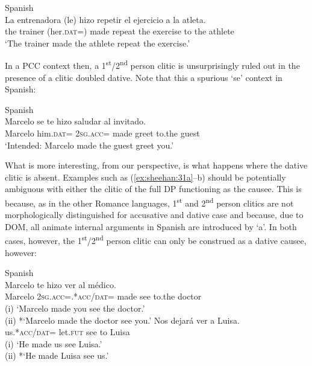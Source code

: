 \documentclass[output=paper,colorlinks,citecolor=brown,nonflat]{./langscibook}
\begin{document}
\ea%
    \label{ex:sheehan:29}
    Spanish \citep[448]{Torrego2010}\\
    \gll    La   entrenadora  (le)   hizo   repetir  el   ejercicio   a     la   atleta.\\
            the   trainer   (her.\textsc{dat}=)   made   repeat  the   exercise   to   the  athlete\\
    \glt    ‘The trainer made the athlete repeat the exercise.’
\z

In a PCC context then, a 1\textsuperscript{st}/2\textsuperscript{nd} person clitic is unsurprisingly ruled out in the presence of a clitic doubled dative. Note that this a spurious ‘se’ context in Spanish:

\ea%
    \label{ex:sheehan:30}
    Spanish\\
    \gll    *Marcelo   se   te   hizo   saludar  al   invitado.\\
            Marcelo   him.\textsc{dat}=  \textsc{2sg}.\textsc{acc}=  made   greet  to.the   guest\\
    \glt    ‘Intended: Marcelo made the guest greet you.’
\z

What is more interesting, from our perspective, is what happens where the dative clitic is absent. Examples such as (\ref{ex:sheehan:31a}--b) should be potentially ambiguous with either the clitic of the full DP functioning as the causee. This is because, as in the other Romance languages, 1\textsuperscript{st} and 2\textsuperscript{nd} person clitics are not morphologically distinguished for accusative and dative case and because, due to DOM, all animate internal arguments in Spanish are introduced by ‘a’.  In both cases, however, the 1\textsuperscript{st}/2\textsuperscript{nd} person clitic can only be construed as a dative causee, however:

\ea%
    \label{ex:sheehan:31}
    Spanish\\
    \ea\label{ex:sheehan:31a}
    \gll    Marcelo   te     hizo     ver   al   médico.\\
            Marcelo   2\textsc{sg}.\textsc{acc}=.*\textsc{acc/dat=}  made  see     to.the   doctor\\
    \glt    (i) ‘Marcelo made you see the doctor.’\\
            (ii) *‘Marcelo made the doctor see you.’
    \ex\label{ex:sheehan:31b}
    \gll    Nos  dejará   ver   a   Luisa.\\
            us.*\textsc{acc/dat=}   let.\textsc{fut}  see   to   Luisa\\
    \glt    (i) ‘He made us see Luisa.’\\
            (ii) *‘He made Luisa see us.’
    \z
\z
\end{document}
